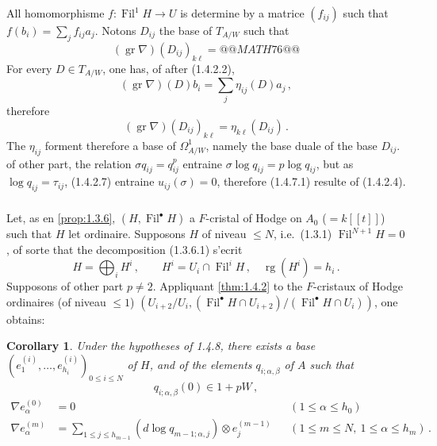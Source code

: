 \documentclass[12pt,a4paper]{article}
\theoremstyle{plain}
\newtheorem{corollary}[theorem]{Corollary}
\theoremstyle{definition}
\theoremstyle{remark}
\DeclareMathOperator{\gr}{gr}
\DeclareMathOperator{\Fil}{Fil}
\DeclareMathOperator{\rg}{rg}
\begin{document}
All homomorphisme $f : \Fil^1H \to U$ is determine by a matrice $(f_{ij})$ such that $f(b_i) = \sum_j f_{ij}a_j$. Notons $D_{ij}$ the base of $T_{A/W}$ such that
\[
(\gr\nabla)(D_{ij})_{k\ell} = @@MATH76@@
\]
For every $D \in T_{A/W}$, one has, of after (1.4.2.2),
\[
(\gr\nabla)(D)b_i = \sum_j \eta_{ij}(D)a_j\,,
\]
therefore
\[
(\gr\nabla)(D_{ij})_{k\ell} = \eta_{k\ell}(D_{ij})\,.\]
The $\eta_{ij}$ forment therefore a base of $\Omega^1_{A/W}$, namely the base duale of the base $D_{ij}$. of other part, the relation $\sigma q_{ij} = q_{ij}^p$ entraine $\sigma\log q_{ij} = p\log q_{ij}$, but as $\log q_{ij} = \tau_{ij}$, (1.4.2.7) entraine $u_{ij}(\sigma) = 0$, therefore (1.4.7.1) resulte of (1.4.2.4).

\subsubsection{}

Let, as en \ref{prop:1.3.6}, $(H, \Fil^\bullet H)$ a $F$-cristal of Hodge on $A_0$ ($= k[[t]]$) such that $H$ let ordinaire. Supposons $H$ of niveau $\leq N$, i.e.\ (1.3.1) $\Fil^{N+1}H = 0$, of sorte that the decomposition (1.3.6.1) s'ecrit
\begin{equation}\label{eq:1.4.8.1}
H = \bigoplus_i H^i\,, \qquad H^i = U_i \cap \Fil^iH\,, \quad \rg(H^i) = h_i\,.\end{equation}
Supposons of other part $p \neq 2$. Appliquant \ref{thm:1.4.2} to the $F$-cristaux of Hodge ordinaires (of niveau $\leq 1$) $(U_{i+2}/U_i, (\Fil^\bullet H \cap U_{i+2})/(\Fil^\bullet H \cap U_i))$, one obtains:

\begin{corollary}\label{cor:1.4.9}
Under the hypotheses of \emph{1.4.8}, there exists a base $(e_1^{(i)}, \ldots, e_{h_i}^{(i)})_{0 \leq i \leq N}$ of $H$, and of the elements $q_{i;\alpha,\beta}$ of $A$ such that
\[
q_{i;\alpha,\beta}(0) \in 1 + pW\,,
\]
\begin{equation}\label{eq:1.4.9.1}
\begin{aligned}
\nabla e_\alpha^{(0)} &= 0 && (1 \leq \alpha \leq h_0)\\
\nabla e_\alpha^{(m)} &= \sum_{1 \leq j \leq h_{m-1}} (d\log q_{m-1;\alpha,j}) \otimes e_j^{(m-1)} && (1 \leq m \leq N,\ 1 \leq \alpha \leq h_m)\,.\end{aligned}
\end{equation}
\end{corollary}
\end{document}
